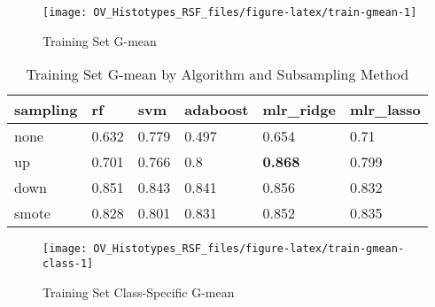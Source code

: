 \documentclass[
]{report}
\begin{document}
\begin{figure}[H]

{\centering \texttt{[image: OV\_Histotypes\_RSF\_files/figure-latex/train-gmean-1]} 

}

\caption{Training Set G-mean}\label{fig:train-gmean}
\end{figure}

\begin{table}

\caption{\label{tab:train-gmean-table}Training Set G-mean by Algorithm and Subsampling Method}
\centering
\begin{tabular}[t]{l|l|l|l|l|l}
\hline
sampling & rf & svm & adaboost & mlr\_ridge & mlr\_lasso\\
\hline
none & 0.632 & 0.779 & 0.497 & 0.654 & 0.71\\
\hline
up & 0.701 & 0.766 & 0.8 & \textbf{0.868} & 0.799\\
\hline
down & 0.851 & 0.843 & 0.841 & 0.856 & 0.832\\
\hline
smote & 0.828 & 0.801 & 0.831 & 0.852 & 0.835\\
\hline
\end{tabular}
\end{table}

\begin{figure}[H]

{\centering \texttt{[image: OV\_Histotypes\_RSF\_files/figure-latex/train-gmean-class-1]} 

}

\caption{Training Set Class-Specific G-mean}\label{fig:train-gmean-class}
\end{figure}
\end{document}
